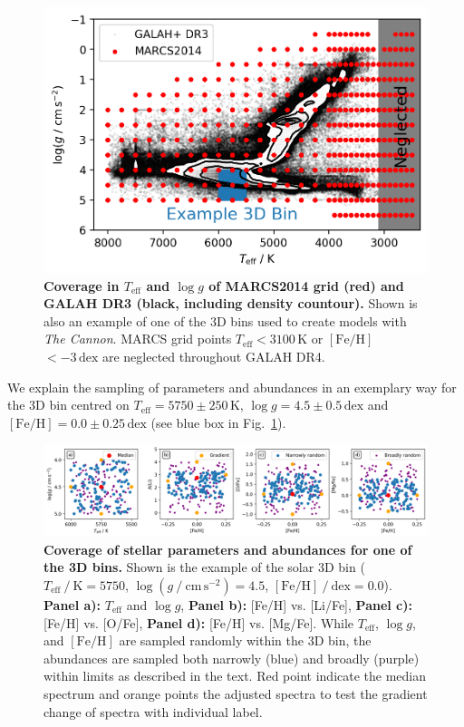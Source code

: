 \documentclass[
  journal=pasa,
  manuscript=research-paper, %
  year=2023,
  volume=37
]{cup-journal}
\newcommand{\Teff}{$T_\mathrm{eff}$\xspace}
\newcommand{\logg}{$\log g$\xspace}
\newcommand{\feh}{$\mathrm{[Fe/H]}$\xspace}
\newcommand{\TheCannon}{\textit{The Cannon}\xspace}
\newcommand{\dex}{\,\mathrm{dex}}	%
\newcommand{\K}{\,\mathrm{K}}	%
\begin{document}
\begin{figure}[hbt]
 \centering
 \includegraphics[width=\textwidth]{figures/teff_logg_grid_coverage.png}
 \caption{\textbf{Coverage in \Teff and \logg of MARCS2014 grid (red) and GALAH DR3 (black, including density countour).} Shown is also an example of one of the 3D bins used to create models with \TheCannon. MARCS grid points \Teff$ < 3100\K$ or \feh$<-3\dex$ are neglected throughout GALAH DR4.}
 \label{fig:teff_logg_grid_coverage}
\end{figure}

We explain the sampling of parameters and abundances in an exemplary way for the 3D bin centred on $T_\text{eff} = 5750\pm250\K$, $\log g = 4.5\pm0.5\dex$ and $\mathrm{[Fe/H]} = 0.0\pm0.25\dex$ (see blue box in Fig.~\ref{fig:teff_logg_grid_coverage}).

\begin{figure}[ht]
 \centering
 \includegraphics[width=\textwidth]{figures/example_3d_bin_sample.png}
 \caption{\textbf{Coverage of stellar parameters and abundances for one of the 3D bins.} Shown is the example of the solar 3D bin ($T_\mathrm{eff}~/~\mathrm{K} = 5750$, $\log (g~/~\mathrm{cm\,s^{-2}}) = 4.5$, $\mathrm{[Fe/H]}~/~\mathrm{dex} = 0.0$). \textbf{Panel a):} \Teff and \logg, \textbf{Panel b):} [Fe/H] vs. [Li/Fe], \textbf{Panel c):} [Fe/H] vs. [O/Fe], \textbf{Panel d):} [Fe/H] vs. [Mg/Fe]. While \Teff, \logg, and \feh are sampled randomly within the 3D bin, the abundances are sampled both narrowly (blue) and broadly (purple) within limits as described in the text. Red point indicate the median spectrum and orange points the adjusted spectra to test the gradient change of spectra with individual label.}
 \label{fig:example_3d_bin_sample}
\end{figure}
\end{document}
